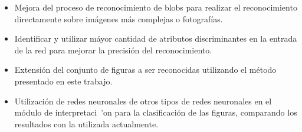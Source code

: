 \documentclass[pdftex,a4paper,10.5pt]{article}
\begin{document}
\begin{itemize}
\item 	Mejora del proceso de reconocimiento de blobs para realizar el reconocimiento directamente sobre im\'agenes m\'as complejas o fotograf\'ias.
\item 	Identificar y utilizar m\'ayor cantidad de atributos discriminantes en la entrada de la red para mejorar la precisi\'on del reconocimiento.
\item 	Extensi\'on del conjunto de figuras a ser reconocidas utilizando el m\'etodo presentado en este trabajo.
\item 	Utilizaci\'on de redes neuronales de otros tipos de redes neuronales en el m\'odulo de interpretaci\ 'on para la clasificaci\'on de las figuras, comparando los resultados con la utilizada actualmente.

\end{itemize}
\newpage
\end{document}
